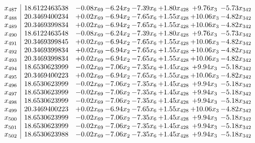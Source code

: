 \documentclass[8pt]{article}
\begin{document}
\[\begin{array}{c| c c@{\hskip 2pt} c@{\hskip 2pt} c@{\hskip 2pt} c@{\hskip 2pt} c@{\hskip 2pt} c@{\hskip 2pt} }
 x_{487}   &  18.6122463538 & -0.08 x_{69} & -6.24 x_{2} & -7.39 x_{6} & +  1.80 x_{428} & +  9.76 x_{3} & -5.73 x_{342}\\
 x_{488}   &  20.3469400234 & +  0.02 x_{69} & -6.94 x_{2} & -7.65 x_{6} & +  1.55 x_{428} & + 10.06 x_{3} & -4.82 x_{342}\\
 x_{489}   &  20.3469399834 & +  0.02 x_{69} & -6.94 x_{2} & -7.65 x_{6} & +  1.55 x_{428} & + 10.06 x_{3} & -4.82 x_{342}\\
 x_{490}   &  18.6122463548 & -0.08 x_{69} & -6.24 x_{2} & -7.39 x_{6} & +  1.80 x_{428} & +  9.76 x_{3} & -5.73 x_{342}\\
 x_{491}   &  20.3469399845 & +  0.02 x_{69} & -6.94 x_{2} & -7.65 x_{6} & +  1.55 x_{428} & + 10.06 x_{3} & -4.82 x_{342}\\
 x_{492}   &  20.3469399834 & +  0.02 x_{69} & -6.94 x_{2} & -7.65 x_{6} & +  1.55 x_{428} & + 10.06 x_{3} & -4.82 x_{342}\\
 x_{493}   &  20.3469399834 & +  0.02 x_{69} & -6.94 x_{2} & -7.65 x_{6} & +  1.55 x_{428} & + 10.06 x_{3} & -4.82 x_{342}\\
 x_{494}   &  18.6530623999 & -0.02 x_{69} & -7.06 x_{2} & -7.35 x_{6} & +  1.45 x_{428} & +  9.94 x_{3} & -5.18 x_{342}\\
 x_{495}   &  20.3469400223 & +  0.02 x_{69} & -6.94 x_{2} & -7.65 x_{6} & +  1.55 x_{428} & + 10.06 x_{3} & -4.82 x_{342}\\
 x_{496}   &  18.6530623999 & -0.02 x_{69} & -7.06 x_{2} & -7.35 x_{6} & +  1.45 x_{428} & +  9.94 x_{3} & -5.18 x_{342}\\
 x_{497}   &  18.6530623999 & -0.02 x_{69} & -7.06 x_{2} & -7.35 x_{6} & +  1.45 x_{428} & +  9.94 x_{3} & -5.18 x_{342}\\
 x_{498}   &  18.6530623999 & -0.02 x_{69} & -7.06 x_{2} & -7.35 x_{6} & +  1.45 x_{428} & +  9.94 x_{3} & -5.18 x_{342}\\
 x_{499}   &  20.3469400223 & +  0.02 x_{69} & -6.94 x_{2} & -7.65 x_{6} & +  1.55 x_{428} & + 10.06 x_{3} & -4.82 x_{342}\\
 x_{500}   &  18.6530623999 & -0.02 x_{69} & -7.06 x_{2} & -7.35 x_{6} & +  1.45 x_{428} & +  9.94 x_{3} & -5.18 x_{342}\\
 x_{501}   &  18.6530623999 & -0.02 x_{69} & -7.06 x_{2} & -7.35 x_{6} & +  1.45 x_{428} & +  9.94 x_{3} & -5.18 x_{342}\\
 x_{502}   &  18.6530623988 & -0.02 x_{69} & -7.06 x_{2} & -7.35 x_{6} & +  1.45 x_{428} & +  9.94 x_{3} & -5.18 x_{342}\\

\end{array}\]
\end{document}
